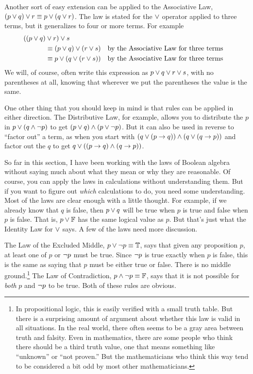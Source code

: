 Another sort of easy extension can be applied to the Associative Law,
$(p\vee q)\vee r\equiv p\vee(q\vee r)$. The law is stated for the $\vee$ operator
applied to three terms, but it generalizes to four or more terms. For example
\begin{align*}
((p\vee q)&\vee r)\vee s\\
     &\equiv (p\vee q)\vee (r\vee s) &&\text{by the Associative Law for three terms}\\
     &\equiv p\vee(q\vee (r\vee s))  &&\text{by the Associative Law for three terms}\\
\end{align*}
We will, of course, often write this expression as $p\vee q\vee r\vee s$, with no
parentheses at all, knowing that wherever we put the parentheses the value is the
same.

One other thing that you should keep in mind is that rules can be applied in
either direction.  The Distributive Law, for example, allows you to
distribute the $p$ in $p\vee(q\wedge\lnot p)$ to get $(p\vee q)\wedge(p\vee\lnot p)$.
But it can also be used in reverse to ``factor out'' a term, as when you
start with $(q\vee(p\rightarrow q))\wedge(q\vee(q\rightarrow p))$ and factor out the $q$
to get $q\vee((p\rightarrow q)\wedge(q\rightarrow p))$.


\medbreak

So far in this section, I have been working with the laws of Boolean
algebra without saying much about what they mean or why they are
reasonable.  Of course, you can apply the laws in calculations without
understanding them.  But if you want to figure out \emph{which}
calculations to do, you need some understanding.  Most of the laws
are clear enough with a little thought.  For example, if we already
know that $q$ is false, then $p\vee q$ will be true when $p$ is true
and false when $p$ is false.  That is, $p\vee\mathbb{F}$ has the same logical
value as $p$.  But that's just what the Identity Law for $\vee$ says.
A few of the laws need more discussion.

The Law of the Excluded Middle, $p\vee\lnot p\equiv \mathbb{T}$,
says that given any proposition $p$, at
least one of $p$ or $\lnot p$ must be true.  Since $\lnot p$ is true 
exactly when $p$ is false, this is the same as saying that
$p$ must be either true or false.   There is no middle
ground.\footnote{In propositional logic, this is easily verified with
a small truth table.  But there is a surprising amount of argument about
whether this law is valid in all situations.  In the real world, there often
seems to be a gray area between truth and falsity.  Even in mathematics,
there are some people who think there should be a third truth value,
one that means something like ``unknown'' or ``not proven.''  But the
mathematicians who think this way tend to be considered a bit odd
by most other mathematicians.}  The Law of Contradiction,
$p\wedge\lnot p\equiv\mathbb{F}$, says that it is not possible for 
\emph{both} $p$ and $\lnot p$ to be true.  Both of these rules are obvious.

